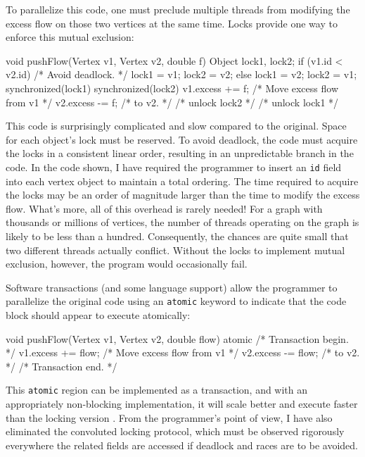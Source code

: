 To parallelize this code, one must preclude multiple threads from
modifying the excess flow on those two vertices at the same time.
Locks provide one way to enforce this mutual exclusion: 
\begin{inlinecode}
void pushFlow(Vertex v1, Vertex v2, double f) {
  Object lock1, lock2;
  if (v1.id < v2.id) {       /* Avoid deadlock. */
    lock1 = v1; lock2 = v2;
  } else {
    lock1 = v2; lock2 = v1;
  }
  synchronized(lock1) {
    synchronized(lock2) {
      v1.excess += f; /* Move excess flow from v1 */
      v2.excess -= f; /* to v2.                   */
    } /* unlock lock2 */
  } /* unlock lock1 */
}
\end{inlinecode}

This code is surprisingly complicated and slow compared to the
original.  Space for each object's lock must be reserved.
To avoid deadlock, the code must acquire the locks in
a consistent linear order, resulting in an unpredictable branch in the
code.  In the code shown,
I have required the programmer to insert an \texttt{id} field into
each vertex object to maintain a total ordering.
The time required to acquire the locks may be
an order of magnitude larger than the time to
modify the excess flow.
What's more, all of this overhead is rarely
needed!  For a graph with thousands or millions of vertices, the
number of threads operating on the graph is likely to be less than a
hundred.  Consequently, the chances are quite small that two different
threads actually conflict.  Without the locks to implement mutual
exclusion, however, the program would occasionally fail.

Software transactions (and some language support) allow the
programmer to parallelize the original code using an \texttt{atomic}
keyword to indicate that the code block should appear to execute
atomically: 
\begin{inlinecode}
void pushFlow(Vertex v1, Vertex v2, double flow) {
  atomic { /* Transaction begin. */
    v1.excess += flow; /* Move excess flow from v1 */
    v2.excess -= flow; /* to v2.                   */
  } /* Transaction end. */
}
\end{inlinecode}

This {\tt atomic} region can be implemented as a transaction, and
with an appropriately non-blocking implementation, it
will scale better and execute faster than the locking version
\cite{AnanianAsKuLeLi04,HarrisFr03,GreenwaldCh96,MassalinPu91,HerlihyMo93,ShavitTo95}.
From the programmer's point of view, I have also eliminated the
convoluted locking protocol, which must
be observed rigorously everywhere the related fields are accessed if
deadlock and races are to be avoided.

